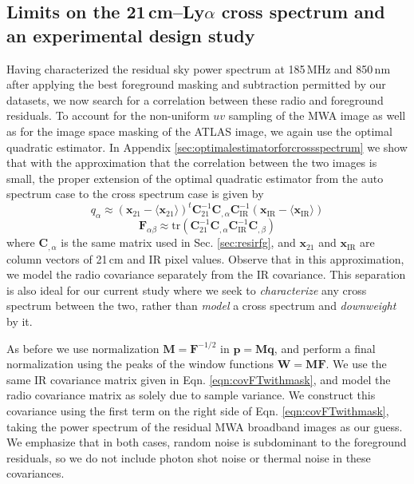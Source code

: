 \documentclass[numberedappendix]{emulateapj}
\newcommand{\IR}{\text{IR}}
\newcommand{\Fb}{\mathbf{F}}
\newcommand{\Mb}{\mathbf{M}}
\newcommand{\Cb}{\mathbf{C}}
\newcommand{\xb}{\mathbf{x}}
\newcommand{\pb}{\mathbf{p}}
\newcommand{\qb}{\mathbf{q}}
\newcommand{\Wb}{\mathbf{W}}
\begin{document}
\subsection{Limits on the 21\,cm--Ly$\alpha$ cross spectrum and an experimental design study}
\label{sec:limitsandexptdesignstudy}

Having characterized the residual sky power spectrum at 185\,MHz and 850\,nm after applying the best foreground masking and subtraction permitted by our datasets, we now search for a correlation between these radio and foreground residuals. To account for the non-uniform $uv$ sampling of the MWA image as well as for the image space masking of the ATLAS image, we again use the optimal quadratic estimator. In Appendix \ref{sec:optimalestimatorforcrossspectrum} we show that with the approximation that the correlation between the two images is small, the proper extension of the optimal quadratic estimator from the auto spectrum case to the cross spectrum case is given by
\begin{equation}
q_\alpha \approx (\xb_{21}-\langle\xb_{21}\rangle)^t \Cb_{21}^{-1} \Cb_{,\alpha}\Cb_\IR^{-1}(\xb_\IR-\langle\xb_\IR\rangle)
\end{equation}
\begin{equation}
\Fb_{\alpha\beta}\approx\text{tr}\left(\Cb_{21}^{-1} \Cb_{,\alpha} \Cb_\IR^{-1}  \Cb_{,\beta}  \right)	
\end{equation}
where $\Cb_{,\alpha}$ is the same matrix used in Sec. \ref{sec:resirfg}, and $\mathbf{x}_{21}$ and $\mathbf{x}_{\IR}$ are column vectors of 21\,cm and IR pixel values. Observe that in this approximation, we model the radio covariance separately from the IR covariance. This separation is also ideal for our current study where we seek to \textit{characterize} any cross spectrum between the two, rather than \textit{model} a cross spectrum and \textit{downweight} by it.

As before we use normalization $\Mb=\Fb^{-1/2}$ in $\pb=\Mb\qb$, and perform a final normalization using the peaks of the window functions $\Wb=\Mb\Fb$. We use the same IR covariance matrix given in Eqn. \ref{eqn:covFTwithmask}, and model the radio covariance matrix as solely due to sample variance. We construct this covariance using the first term on the right side of Eqn. \ref{eqn:covFTwithmask}, taking the power spectrum of the residual MWA broadband images as our guess. We emphasize that in both cases, random noise is subdominant to the foreground residuals, so we do not include photon shot noise or thermal noise in these covariances. 
\end{document}
